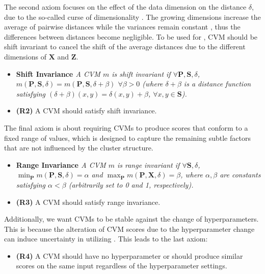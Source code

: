 The second axiom focuses on the effect of the data dimension on the distance $\delta$, due to the so-called curse of dimensionality \cite{bellman66science}. 
The growing dimensions increase the average of pairwise distances while the variances remain constant \cite{beyer99icdt, francois07tkde, lee11pcs}, thus the differences between distances become negligible. 
To be used for \ltc, CVM should be shift invariant \cite{lee11pcs, lee14cidm} to cancel the shift of the average distances due to the different dimensions of $\mathbf{X}$ and $\mathbf{Z}$.
\begin{itemize}[leftmargin=0pt]
    \item[]  \textbf{Shift Invariance \cite{jeon22arxiv2}} \textit{A CVM $m$ is shift invariant if $\forall \mathbf{P}, \mathbf{S}, \delta$, $m(\mathbf{P}, \mathbf{S}, \delta) = m(\mathbf{P}, \mathbf{S}, \delta+ \beta)$ $ \forall \beta > 0$ (where $\delta + \beta$ is a distance function satisfying $(\delta + \beta)(x,y) = \delta(x,y) + \beta$, $\forall x, y \in \mathbf{S}$).}
    \item[]  \textbf{(R2)} A  CVM should satisfy shift invariance.
\end{itemize}

The final axiom is about requiring CVMs to produce scores that conform to a fixed range of values, which is designed to capture the remaining subtle factors that are not influenced by the cluster structure. 
\begin{itemize}[leftmargin=0pt]
    \item[]  \textbf{Range Invariance \cite{jeon22arxiv2}} \textit{A CVM $m$ is range invariant if $\forall \mathbf{S}, \delta$, $\min_{\mathbf{P}} m(\mathbf{P},\mathbf{S},\delta)=\alpha$ and $\max_{\mathbf{P}} m(\mathbf{P},\mathbf{X},\delta)=\beta$, where $\alpha, \beta$ are constants satisfying $\alpha < \beta$ (arbitrarily set to 0 and 1, respectively).}
    \item[]  \textbf{(R3)} A CVM should satisfy range invariance.
\end{itemize}

Additionally, we want CVMs to be stable against the change of hyperparameters. 
This is because the alteration of CVM scores due to the hyperparameter change can induce uncertainty in utilizing \ltc. 
This leads to the last axiom:

\begin{itemize}[leftmargin=0pt]
    \item[]  \textbf{(R4)} A CVM should have no hyperparameter or should produce similar scores on the same input regardless of the hyperparameter settings.
\end{itemize}



